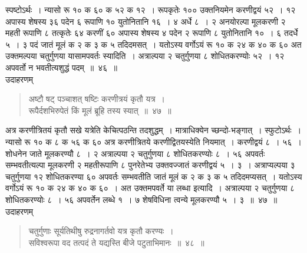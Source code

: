 \documentclass[11pt, openany]{book}
\begin{document}
{{ स्पष्टोऽर्थः~। न्यासो रू १० क ६० क ५२ क १२~। रूपकृतेः १०० उक्तनियमेन करणीद्वयं ५२~। १२ अपास्य शेषस्य ३६ पदेन ६ रूपाणि १० युतोनितानि 
१६~। ४ अर्धे ८~। २ अनयोरल्पा मूलकरणी २ महती रूपाणि ८ तत्कृतेः ६४ 
करणीं ६० अपास्य शेषस्य ४ पदेन २ रूपाणि ८ युतोनितानि १०~। ६ तदर्धे
\newpage
\noindent ५~। ३ पदं जातं मूलं क २ क ३ क ५ तदिदमसत्~। यतोऽस्य वर्गोऽयं रू १० क २४ क ४० क ६० अत उक्तमल्पया चतुर्गुणया यासामपवर्तः स्यादिति~। अत्राल्पया २ चतुर्गुणया ८ शोधितकरण्योः ५२~। १२ अपवर्तो न भवतीत्यशुद्धं पदम्~॥~४६~॥\\

\vspace{-2mm}
{\bqt उदाहरणम्\textendash}
\begin{quote}
    \eg 
     अष्टौ षट् पञ्चाशत् षष्टिः करणीत्रयं कृतौ यत्र~। \\
 रूपैर्दशभिरुपेतं किं मूलं ब्रूहि तस्य स्यात्~॥~४७~॥
\end{quote}

 अत्र करणीत्रितयं कृतौ सखे यत्रेति केचित्पठन्ति तदशुद्धम्~। मात्राधिक्येन 
च्छन्दो-भङ्गात्~। स्फुटोऽर्थः~। न्यासो रू १० क ८ क ५६ क ६० अत्र
करणीत्रितये करणीद्वितयस्येति नियमात्~। करणीद्वयं ८~। ५६~। शोधनेन जाते
मूलकरण्यौ ८~। २ अत्राल्पया २ चतुर्गुणया ८ शोधितकरण्योः ८~। ५६ अपवर्तः 
सम्भवतीत्यल्पा मूलकरणी २ महतीरूपाणि ८ पुनरेतेभ्य उक्तवज्जातं करणीद्वयं ५~। ३~। अत्राप्यल्पया ३ चतुर्गुणया १२ शोधितकरण्या ६० अपवर्तः सम्भवतीति जातं मूलं क २ क ३ क ५ तदिदमप्यसत्~। यतोऽस्य वर्गोऽयं रू १० क २४ क ४० क ६०~। अत उक्तमपवर्ते या लब्धा इत्यादि~। अत्राल्पया २ चतुर्गुणया ८ शोधितकरण्योः ८~। ५६ अपवर्तेन लब्धे १~। ७ शेषविधिना त्वन्ये मूलकरण्यौ ५~। ३~॥~४७~॥\\

\vspace{-2mm}
{\bqt उदाहरणम्\textendash \,}
\begin{quote}
    \eg 
     चतुर्गुणाः सूर्यतिथीषु रुद्रनागर्तवो यत्र कृतौ करण्यः~। \\
 सविश्वरूपा वद तत्पदं ते यद्यस्ति बीजे पटुताभिमानः~॥~४८~॥\\
\end{quote}
\vspace{-4mm}

}}
\end{document}
